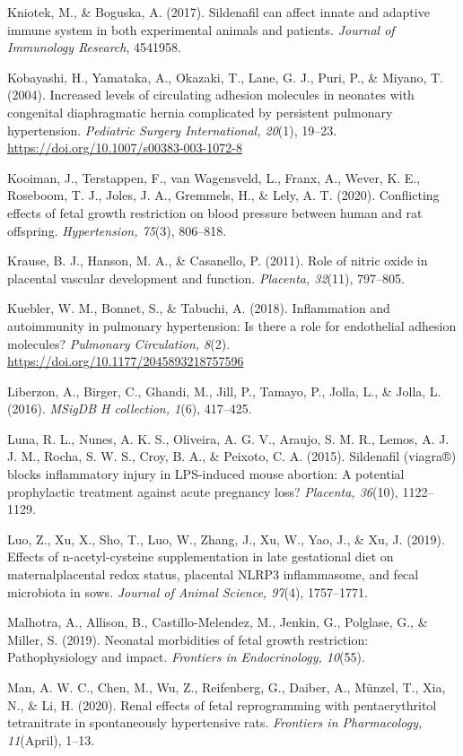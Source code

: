 \documentclass[authordate, empirical,issue]{jote-new-article}
\begin{document}
Kniotek, M., \& Boguska, A. (2017). Sildenafil can affect innate and adaptive immune system in both experimental animals and patients. \emph{Journal of Immunology Research}, 4541958.

Kobayashi, H., Yamataka, A., Okazaki, T., Lane, G. J., Puri, P., \& Miyano, T. (2004). Increased levels of circulating adhesion molecules in neonates with congenital diaphragmatic hernia complicated by persistent pulmonary hypertension. \emph{Pediatric Surgery International, 20}(1), 19–23. \url{https://doi.org/10.1007/s00383-003-1072-8}

Kooiman, J., Terstappen, F., van Wagensveld, L., Franx, A., Wever, K. E., Roseboom, T. J., Joles, J. A., Gremmels, H., \& Lely, A. T. (2020). Conflicting effects of fetal growth restriction on blood pressure between human and rat offspring. \emph{Hypertension, 75}(3), 806–818.

Krause, B. J., Hanson, M. A., \& Casanello, P. (2011). Role of nitric oxide in placental vascular development and function. \emph{Placenta, 32}(11), 797–805.

Kuebler, W. M., Bonnet, S., \& Tabuchi, A. (2018). Inflammation and autoimmunity in pulmonary hypertension: Is there a role for endothelial adhesion molecules? \emph{Pulmonary Circulation, 8}(2). \url{https://doi.org/10.1177/2045893218757596}

Liberzon, A., Birger, C., Ghandi, M., Jill, P., Tamayo, P., Jolla, L., \& Jolla, L. (2016). \emph{MSigDB H collection, 1}(6), 417–425.

Luna, R. L., Nunes, A. K. S., Oliveira, A. G. V., Araujo, S. M. R., Lemos, A. J. J. M., Rocha, S. W. S., Croy, B. A., \& Peixoto, C. A. (2015). Sildenafil (viagra®) blocks inflammatory injury in LPS-induced mouse abortion: A potential prophylactic treatment against acute pregnancy loss? \emph{Placenta, 36}(10), 1122–1129.

Luo, Z., Xu, X., Sho, T., Luo, W., Zhang, J., Xu, W., Yao, J., \& Xu, J. (2019). Effects of n-acetyl-cysteine supplementation in late gestational diet on maternalplacental redox status, placental NLRP3 inflammasome, and fecal microbiota in sows. \emph{Journal of Animal Science, 97}(4), 1757–1771.

Malhotra, A., Allison, B., Castillo-Melendez, M., Jenkin, G., Polglase, G., \& Miller, S. (2019). Neonatal morbidities of fetal growth restriction: Pathophysiology and impact. \emph{Frontiers in Endocrinology, 10}(55).

Man, A. W. C., Chen, M., Wu, Z., Reifenberg, G., Daiber, A., Münzel, T., Xia, N., \& Li, H. (2020). Renal effects of fetal reprogramming with pentaerythritol tetranitrate in spontaneously hypertensive rats. \emph{Frontiers in Pharmacology, 11}(April), 1–13.
\end{document}
